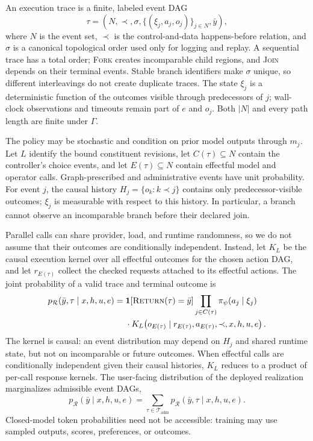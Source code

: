 An execution trace is a finite, labeled event DAG
\begin{equation}
  \tau=(N,\prec,\sigma,\{(\xi_j,a_j,o_j)\}_{j\in N},\bar y),
  \label{eq:trace}
\end{equation}
where $N$ is the event set, $\prec$ is the control-and-data happens-before
relation, and $\sigma$ is a canonical topological order used only for logging
and replay. A sequential trace has a total order; \textsc{Fork} creates
incomparable child regions, and \textsc{Join} depends on their terminal events.
Stable branch identifiers make $\sigma$ unique, so different interleavings do
not create duplicate traces. The state $\xi_j$ is a deterministic function of
the outcomes visible through predecessors of $j$; wall-clock observations and
timeouts remain part of $e$ and $o_j$. Both $|N|$ and every path length are
finite under $\Gamma$.

The policy may be stochastic and condition on prior model outputs through
$m_j$. Let $L$ identify the bound constituent revisions, let $C(\tau)\subseteq
N$ contain the controller's choice events, and let $E(\tau)\subseteq N$ contain
effectful model and operator calls. Graph-prescribed and administrative events
have unit probability. For event $j$, the causal history
$H_j=\{o_k:k\prec j\}$ contains only predecessor-visible outcomes; $\xi_j$ is
measurable with respect to this history. In particular, a branch cannot observe
an incomparable branch before their declared join.

Parallel calls can share provider, load, and runtime randomness, so we do not
assume that their outcomes are conditionally independent. Instead, let
$K_L$ be the causal execution kernel over all effectful outcomes for the chosen
action DAG, and let $r_{E(\tau)}$ collect the checked requests attached to its
effectful actions. The joint probability of a valid trace and terminal outcome is
\begin{equation}
\begin{aligned}
 p_{\mathcal{R}}(\bar y,\tau\mid x,h,u,e)
 ={}& \mathbf{1}[\textsc{Return}(\tau)=\bar y]
      \prod_{j\in C(\tau)}\pi_{\psi}(a_j\mid\xi_j)\\
 &\cdot K_L\!\left(o_{E(\tau)}\mid r_{E(\tau)},a_{E(\tau)},
                   \prec,x,h,u,e\right).
\end{aligned}
\label{eq:trace-factorization}
\end{equation}
The kernel is causal: an event distribution may depend on $H_j$ and shared
runtime state, but not on incomparable or future outcomes. When effectful calls
are conditionally independent given their causal histories, $K_L$ reduces to a
product of per-call response kernels. The user-facing distribution of the
deployed realization marginalizes admissible event DAGs,
\begin{equation}
 p_{\mathcal{R}}(\bar y\mid x,h,u,e)
 = \sum_{\tau\in\mathcal{T}_{\mathrm{adm}}}
   p_{\mathcal{R}}(\bar y,\tau\mid x,h,u,e).
 \label{eq:mom-distribution}
\end{equation}
Closed-model token probabilities need not be accessible: training may use
sampled outputs, scores, preferences, or outcomes.

